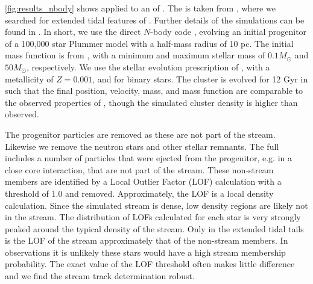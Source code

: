 \documentclass[fleqn,usenatbib]{mnras}
\begin{document}
    \autoref{fig:results_nbody} shows \trackstream{} applied to an \nbody{} of
    . The \nbody{} is taken from \citet{Starkman2019}, where
    we searched for extended tidal features of . Further
    details of the simulations can be found in \citet{Starkman2019}. In short,
    we use the direct $N$-body code \nbodysix{} \citep{Aarseth2006}, evolving an
    initial progenitor of a 100,000 star Plummer model with a half-mass radius
    of 10 pc. The initial mass function is from \citep{Kroupa2001ki}, with a
    minimum and maximum stellar mass of $0.1 M_\odot$ and $50 M_\odot$,
    respectively. We use the stellar evolution prescription of
    \citet{Hurley2000}, with a metallicity of $Z=0.001$, and \citet{Hurley2002}
    for binary stars. The cluster is evolved for 12 Gyr in \galpyMWPotential
    such that the final position, velocity, mass, and mass function are
    comparable to the observed properties of 
    \citep{Ibata2017, Grillmair2001}, though the simulated cluster density is
    higher than observed.

    The progenitor particles are removed as these are not part of the stream.
    Likewise we remove the neutron stars and other stellar remnants. The full
    \nbody{} includes a number of particles that were ejected from
    the progenitor, e.g. in a close core interaction, that are not part of the
    stream. These non-stream members are identified by a Local Outlier Factor
    (LOF) calculation \citep{Breunig2000} with a threshold of $1.0$ and removed.
    Approximately, the LOF is a local density calculation. Since the simulated
    stream is dense, low density regions are likely not in the stream. The
    distribution of LOFs calculated for each star is very strongly peaked around
    the typical density of the stream. Only in the extended tidal tails is the
    LOF of the stream approximately that of the non-stream members. In
    observations it is unlikely these stars would have a high stream membership
    probability. The exact value of the LOF threshold often makes little
    difference and we find the stream track determination robust.
\end{document}
